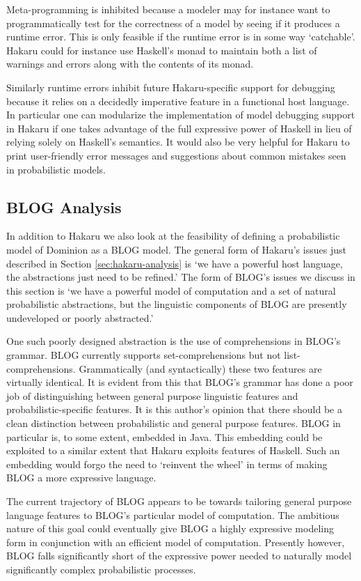 Meta-programming is inhibited because a modeler may for instance want to
programmatically test for the correctness of a model by seeing if it
produces a runtime error. This is only feasible if the runtime error
is in some way `catchable'. Hakaru could for instance use Haskell's
 monad to maintain both a list of warnings and errors
along with the contents of its  monad.

Similarly runtime errors inhibit future Hakaru-specific support for
debugging because it relies on a decidedly imperative feature in a
functional host language. In particular one can modularize the implementation
of model debugging support in Hakaru if one takes advantage of the full
expressive power of Haskell in lieu of relying solely on Haskell's 
semantics. It would also be very helpful for Hakaru to print user-friendly
error messages and suggestions about common mistakes seen in probabilistic
models.

\subsection{BLOG Analysis} \label{sec:blog-analysis}

In addition to Hakaru we also look at the feasibility of defining a
probabilistic model of Dominion as a BLOG model. The general form
of Hakaru's issues just described in Section \ref{sec:hakaru-analysis}
is `we have a powerful host language, the abstractions
just need to be refined.' The form of BLOG's issues we discuss in this
section is `we have a powerful model of computation and a set of
natural probabilistic abstractions, but the linguistic components
of BLOG are presently undeveloped or poorly abstracted.'

One such poorly designed abstraction is the use of comprehensions
in BLOG's grammar. BLOG currently supports set-comprehensions
but not list-comprehensions. Grammatically (and syntactically) these
two features are virtually identical.
It is evident from this that BLOG's grammar has done a poor job of
distinguishing between general purpose linguistic features and
probabilistic-specific features. It is this author's opinion that
there should be a clean distinction between probabilistic and
general purpose features. BLOG in particular is, to some extent, embedded
in Java. This embedding could be exploited to a similar extent that
Hakaru exploits features of Haskell. Such an embedding would forgo the
need to `reinvent the wheel' in terms of making BLOG a more expressive
language.

The current trajectory of BLOG appears to be towards tailoring
general purpose language features to BLOG's particular model of computation.
The ambitious nature of this goal could eventually give BLOG a highly
expressive modeling form in conjunction with an efficient model of
computation. Presently however, BLOG falls significantly short of the
expressive power needed to naturally model significantly complex
probabilistic processes.


